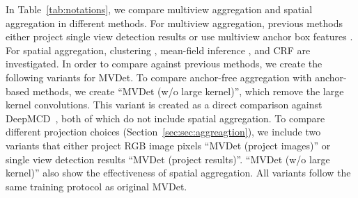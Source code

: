 \documentclass[runningheads]{llncs}
\begin{document}
In Table~\ref{tab:notations}, we compare multiview aggregation and spatial aggregation in different methods. 
For multiview aggregation, previous methods either project single view detection results \cite{xu2016multi,fleuret2007multicamera} or use multiview anchor box features \cite{chavdarova2017deep,baque2017deep}. For spatial aggregation, clustering \cite{xu2016multi}, mean-field inference \cite{fleuret2007multicamera,baque2017deep}, and CRF \cite{baque2017deep,roig2011conditional} are investigated. 
In order to compare against previous methods, we create the following variants for MVDet. 
To compare anchor-free aggregation with anchor-based methods, we create ``MVDet (w/o large kernel)'', which remove the large kernel convolutions. This variant is created as a direct comparison against DeepMCD~\cite{chavdarova2017deep}, both of which do not include spatial aggregation. 
To compare different projection choices (Section~\ref{sec:sec:aggreagtion}), we include two variants that either project RGB image pixels ``MVDet (project images)'' or single view detection results ``MVDet (project results)''. 
``MVDet (w/o large kernel)'' also show the effectiveness of spatial aggregation. 
All variants follow the same training protocol as original MVDet.
\end{document}
